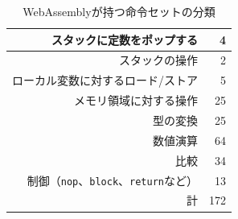 \begin{table}[htbp]
  \caption{WebAssemblyが持つ命令セットの分類}
  \label{tb:wasm_opcodes}
  \begin{center}
    \begin{tabular}{|r|r|}
      \hline
      スタックに定数をポップする & 4 \\ \hline
      スタックの操作 & 2 \\ \hline
      ローカル変数に対するロード/ストア & 5 \\ \hline
      メモリ領域に対する操作 & 25 \\ \hline
      型の変換 & 25 \\ \hline
      数値演算 & 64 \\ \hline
      比較 & 34 \\ \hline
      制御（\verb|nop|、\verb|block|、\verb|return|など） & 13 \\ \hline
      \hline
      計 & 172 \\ \hline
    \end{tabular}
  \end{center}
\end{table}
